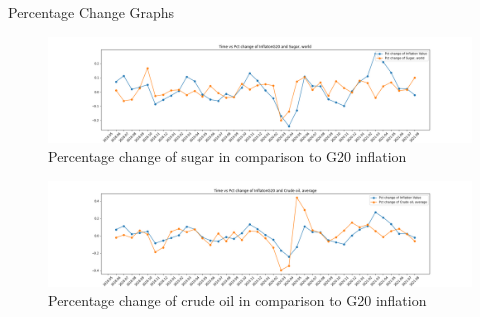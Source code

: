 \begin{frame}{Percentage Change Graphs}
 \begin{figure} [H]
	\begin{center}
		\includegraphics[scale=0.2]{images/illustrate/pct_change_inflation_and_Sugar, world.png}
	\end{center}
	\caption{Percentage change of sugar in comparison to G20 inflation  }
	\label{fig:log-archi}
\end{figure}


\begin{figure} [H]
	\begin{center}
		\includegraphics[scale=0.2]{images/illustrate/pct_change_inflation_and_Crude oil, average.png}
	\end{center}
	\caption{Percentage change of crude oil in comparison to G20 inflation  }
	\label{fig:log-archi}
\end{figure}

\end{frame}

